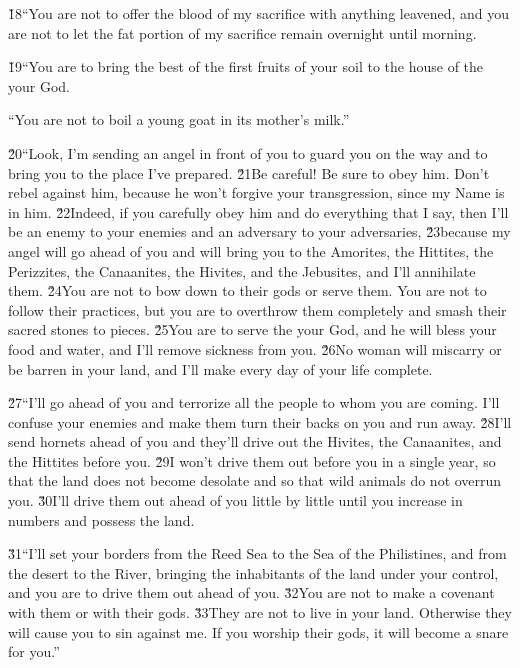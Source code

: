 \v{18}``You are not to offer the blood of my sacrifice with anything leavened, and you are not to let the fat portion of my sacrifice remain overnight until morning.

\v{19}``You are to bring the best of the first fruits of your soil to the house of the  your God.

``You are not to boil a young goat in its mother's milk.''

\v{20}``Look, I'm sending an angel in front of you to guard you on the way and to bring you to the place I've prepared. \v{21}Be careful! Be sure to obey him. Don't rebel against him, because he won't forgive your transgression, since my Name is in him. \v{22}Indeed, if you carefully obey him and do everything that I say, then I'll be an enemy to your enemies and an adversary to your adversaries, \v{23}because my angel will go ahead of you and will bring you to the Amorites, the Hittites, the Perizzites, the Canaanites, the Hivites, and the Jebusites, and I'll annihilate them. \v{24}You are not to bow down to their gods or serve them. You are not to follow their practices, but you are to overthrow them completely and smash their sacred stones to pieces. \v{25}You are to serve the  your God, and he will bless your food and water, and I'll remove sickness from you. \v{26}No woman will miscarry or be barren in your land, and I'll make every day of your life complete.

\v{27}``I'll go ahead of you and terrorize all the people to whom you are coming. I'll confuse your enemies and make them turn their backs on you and run away. \v{28}I'll send hornets ahead of you and they'll drive out the Hivites, the Canaanites, and the Hittites before you. \v{29}I won't drive them out before you in a single year, so that the land does not become desolate and so that wild animals do not overrun you. \v{30}I'll drive them out ahead of you little by little until you increase in numbers and possess the land.

\v{31}``I'll set your borders from the Reed Sea to the Sea of the Philistines, and from the desert to the River, bringing the inhabitants of the land under your control, and you are to drive them out ahead of you. \v{32}You are not to make a covenant with them or with their gods. \v{33}They are not to live in your land. Otherwise they will cause you to sin against me. If you worship their gods, it will become a snare for you.''

